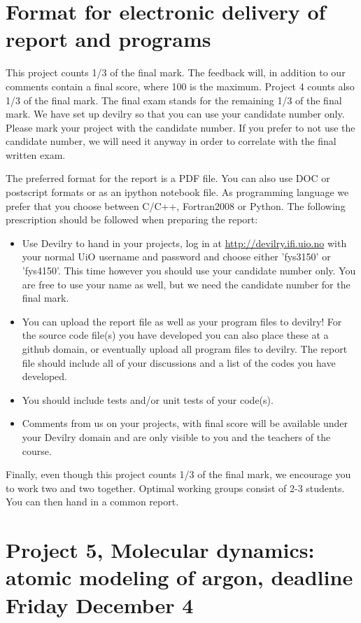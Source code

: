 \documentclass[11pt,a4wide]{article}
\begin{document}
\section*{Format for electronic delivery of report and programs}
%
This project counts 1/3 of the final mark. The feedback will, in addition to our comments contain a final score, where 100 is the maximum. Project 4 counts also 1/3 of the final mark. The final exam stands for the remaining 1/3 of the final mark.
We have set up devilry so that you can use your candidate number only. Please mark your project with the candidate number. If you prefer to not use the candidate number, we will need it anyway in order to correlate with the final written exam. 

The preferred format for the report is a PDF file. You can also
use DOC or postscript formats or as an ipython notebook file. 
As programming language we prefer that you choose between C/C++, Fortran2008 or Python.
The following prescription should be followed when preparing the report:
\begin{itemize}
\item Use Devilry to hand in your projects, log in  at 
\url{ http://devilry.ifi.uio.no} with your normal UiO username and password
and choose either 'fys3150' or 'fys4150'. This time however you should use your candidate number only. You are free to use your name as well, but we need the candidate number for the final mark. 
\item You can upload the report file as well as your program files to devilry!  For the source code file(s) you have developed you can also place these at  a github domain, or eventually upload all program files to devilry.  
The report file should include all of your discussions and a list of the codes you have developed. 
\item You should include tests and/or unit tests of your code(s).
\item Comments  from us on your projects, with final score
will be available under
your Devilry domain and are only visible to you and the teachers of the course.

\end{itemize}

Finally, even though this project counts 1/3 of the final mark, 
we encourage you to work two and two together. Optimal working groups consist of 
2-3 students. You can then hand in a common report. 


\section*{Project 5, Molecular dynamics: atomic modeling of argon, deadline  Friday December 4}
\end{document}
